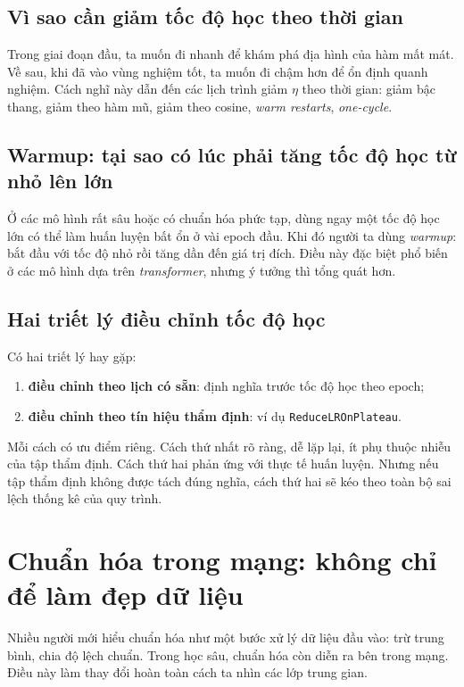 \subsection{Vì sao cần giảm tốc độ học theo thời gian}

Trong giai đoạn đầu, ta muốn đi nhanh để khám phá địa hình của hàm mất mát. Về sau, khi đã vào vùng nghiệm tốt, ta muốn đi chậm hơn để ổn định quanh nghiệm. Cách nghĩ này dẫn đến các lịch trình giảm \(\eta\) theo thời gian: giảm bậc thang, giảm theo hàm mũ, giảm theo cosine, \emph{warm restarts}, \emph{one-cycle}.

\subsection{Warmup: tại sao có lúc phải tăng tốc độ học từ nhỏ lên lớn}

Ở các mô hình rất sâu hoặc có chuẩn hóa phức tạp, dùng ngay một tốc độ học lớn có thể làm huấn luyện bất ổn ở vài epoch đầu. Khi đó người ta dùng \emph{warmup}: bắt đầu với tốc độ nhỏ rồi tăng dần đến giá trị đích. Điều này đặc biệt phổ biến ở các mô hình dựa trên \emph{transformer}, nhưng ý tưởng thì tổng quát hơn.

\subsection{Hai triết lý điều chỉnh tốc độ học}

Có hai triết lý hay gặp:

\begin{enumerate}
\item \textbf{điều chỉnh theo lịch có sẵn}: định nghĩa trước tốc độ học theo epoch;
\item \textbf{điều chỉnh theo tín hiệu thẩm định}: ví dụ \texttt{ReduceLROnPlateau}.
\end{enumerate}

Mỗi cách có ưu điểm riêng. Cách thứ nhất rõ ràng, dễ lặp lại, ít phụ thuộc nhiễu của tập thẩm định. Cách thứ hai phản ứng với thực tế huấn luyện. Nhưng nếu tập thẩm định không được tách đúng nghĩa, cách thứ hai sẽ kéo theo toàn bộ sai lệch thống kê của quy trình.

\section{Chuẩn hóa trong mạng: không chỉ để làm đẹp dữ liệu}

Nhiều người mới hiểu chuẩn hóa như một bước xử lý dữ liệu đầu vào: trừ trung bình, chia độ lệch chuẩn. Trong học sâu, chuẩn hóa còn diễn ra bên trong mạng. Điều này làm thay đổi hoàn toàn cách ta nhìn các lớp trung gian.

